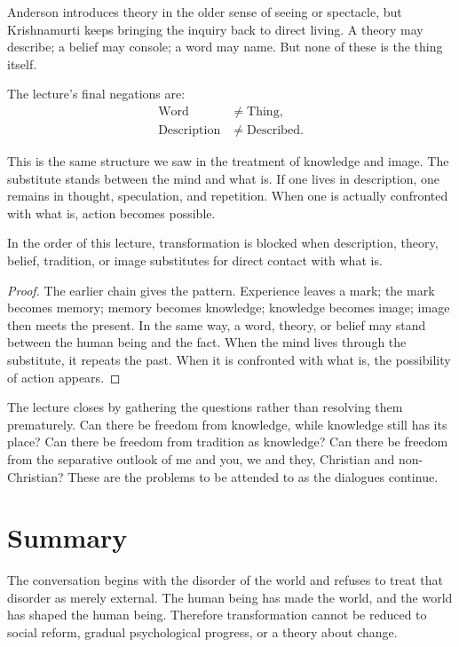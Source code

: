 Anderson introduces theory in the older sense of seeing or spectacle, but Krishnamurti keeps bringing the inquiry back to direct living. A theory may describe; a belief may console; a word may name. But none of these is the thing itself.

The lecture's final negations are:
\begin{align}
\mathrm{Word} &\ne \mathrm{Thing},\\
\mathrm{Description} &\ne \mathrm{Described}.
\end{align}

This is the same structure we saw in the treatment of knowledge and image. The substitute stands between the mind and what is. If one lives in description, one remains in thought, speculation, and repetition. When one is actually confronted with what is, action becomes possible.

\begin{proposition}
In the order of this lecture, transformation is blocked when description, theory, belief, tradition, or image substitutes for direct contact with what is.
\end{proposition}

\begin{proof}
The earlier chain gives the pattern. Experience leaves a mark; the mark becomes memory; memory becomes knowledge; knowledge becomes image; image then meets the present. In the same way, a word, theory, or belief may stand between the human being and the fact. When the mind lives through the substitute, it repeats the past. When it is confronted with what is, the possibility of action appears.
\end{proof}

The lecture closes by gathering the questions rather than resolving them prematurely. Can there be freedom from knowledge, while knowledge still has its place? Can there be freedom from tradition as knowledge? Can there be freedom from the separative outlook of me and you, we and they, Christian and non-Christian? These are the problems to be attended to as the dialogues continue.

\section{Summary}

The conversation begins with the disorder of the world and refuses to treat that disorder as merely external. The human being has made the world, and the world has shaped the human being. Therefore transformation cannot be reduced to social reform, gradual psychological progress, or a theory about change.

